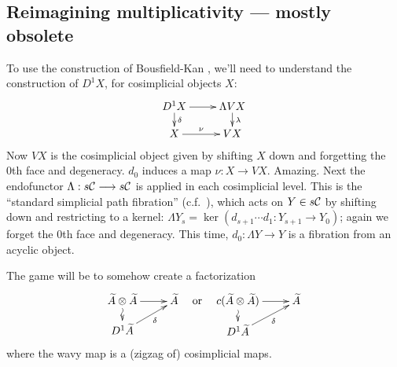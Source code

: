 \documentclass[10pt]{article}
\newcommand{\Comm}{\calC}
\begin{document}
\begin{Thoughts on Adams Multiplicativity II}
\pagebreak
\section{Reimagining multiplicativity --- mostly obsolete}
To use the construction of Bousfield-Kan \cite{BK_pairings_products.pdf,BK_pairings.pdf}, we'll need to understand the construction of $D^1X$, for cosimplicial objects $X$:
\[\xymatrix@R=4mm{
D^1X\ar[r]
\ar[d]^-{\delta}
&%
\Lambda VX\ar[d]^-{\lambda}
\\%
X\ar[r]^-{\nu}
&%
VX%
}\]
Now $VX$ is the cosimplicial object given by shifting $X$ down and forgetting the 0th face and degeneracy. $d_0$ induces a map $\nu:X\to VX$. Amazing. Next the endofunctor $\Lambda:s\Comm\to s\Comm$ is applied in each cosimplicial level. This is the ``standard simplicial path fibration'' (c.f.\ \cite[p.82]{BousKanSSeq.pdf}), which acts on $Y\in s\Comm$ by shifting down and restricting to a kernel: $\Lambda Y_s=\ker(d_{s+1}\cdots d_1:Y_{s+1}\to Y_0)$; again we forget the 0th face and degeneracy. This time, $d_0:\Lambda Y\to Y$ is a fibration from an acyclic object.

The game will be to somehow create a factorization
\[\xymatrix@R=4mm{
\widetilde{A}\otimes \widetilde{A}\ar[r]\ar@{~>}[d]
&%
\widetilde{A}\\%
D^1\widetilde{A}\ar[ur]_-{\delta}
&%
}\textup{\ \ \ or\ \ \ }
\xymatrix@R=4mm{
c(\widetilde{A}\otimes \widetilde{A})\ar[r]\ar@{~>}[d]
&%
\widetilde{A}\\%
D^1\widetilde{A}\ar[ur]_-{\delta}
&%
}\]
where the wavy map is a (zigzag of) cosimplicial maps.


\end{Thoughts on Adams Multiplicativity II}
\end{document}
